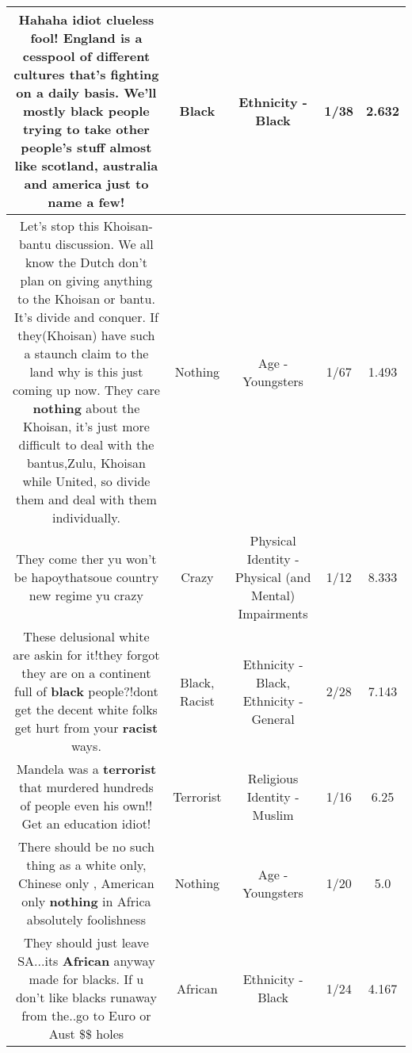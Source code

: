 \documentclass[11pt]{article}
\newlength\mylength
\begin{document}
\begin{center}
\begin{longtable}{|C{.65\mylength}|C{.30\mylength}|C{.12\mylength}|C{.12\mylength}|C{.12\mylength}|}
  \small Hahaha idiot clueless fool! England is a cesspool of different cultures that's fighting on a daily basis. We'll mostly \textbf{black} people trying to take other people's stuff almost like scotland, australia and america just to name a few!\normalsize   & Black & Ethnicity - Black & 1/38 & 2.632 \\  \hline
  \small Let's stop this Khoisan-bantu discussion. We all know the Dutch don't plan on giving anything to the Khoisan or bantu. It's divide and conquer. If they(Khoisan) have such a staunch claim to the land why is this just coming up now. They care \textbf{nothing} about the Khoisan, it's just more difficult to deal with the bantus,Zulu, Khoisan while United, so divide them and deal with them individually.\normalsize   & Nothing & Age - Youngsters & 1/67 & 1.493 \\  \hline
  \small They come ther yu won't be hapoythatsoue country new regime yu crazy\normalsize   & Crazy & Physical Identity - Physical (and Mental) Impairments & 1/12 & 8.333 \\  \hline
  \small These delusional white are askin for it!they forgot they are on a continent full of \textbf{black} people?!dont get the decent white folks get hurt from your \textbf{racist} ways.\normalsize   & Black, Racist & Ethnicity - Black, Ethnicity - General & 2/28 & 7.143 \\  \hline
  \small Mandela was a \textbf{terrorist} that murdered hundreds of people even his own!! Get an education idiot!\normalsize   & Terrorist & Religious Identity - Muslim & 1/16 & 6.25 \\  \hline
  \small There should be no such thing as a white only, Chinese only , American only \textbf{nothing} in Africa absolutely foolishness\normalsize   & Nothing & Age - Youngsters & 1/20 & 5.0 \\  \hline
  \small They should just leave SA...its \textbf{African} anyway made for blacks. If u don't like blacks runaway from the..go to Euro or Aust \@\$\$ holes\normalsize   & African & Ethnicity - Black & 1/24 & 4.167 \\  \hline

\end{longtable}
\end{center}
\end{document}
